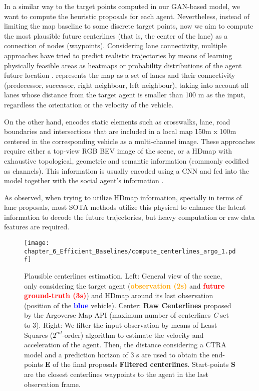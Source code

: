 In a similar way to the target points computed in our \ac{GAN}-based model, we want to compute the heuristic proposals for each agent. Nevertheless, instead of limiting the map baseline to some discrete target points, now we aim to compute the most plausible future centerlines (that is, the center of the lane) as a connection of nodes (waypoints). Considering lane connectivity, multiple approaches have tried to predict realistic trajectories by means of learning physically feasible areas as heatmaps or probability distributions of the agent future location \cite{dendorfer2020goal, sadeghian2019sophie, gilles2021home}. \cite{liang2020learning} represents the map as a set of lanes and their connectivity (predecessor, successor, right neighbour, left neighbour), taking into account all lanes whose distance from the target agent is smaller than 100 m as the input, regardless the orientation or the velocity of the vehicle. 

On the other hand, \cite{djuric2021multixnet} encodes static elements such as crosswalks, lane, road boundaries and intersections that are included in a local map 150m x 100m centered in the corresponding vehicle  as a multi-channel image.  These approaches require either a top-view RGB \ac{BEV} image of the scene, or a \ac{HDmap} with exhaustive topological, geometric and semantic information (commonly codified as channels). This information is usually encoded using a \ac{CNN} and fed into the model together with the social agent's information \cite{dendorfer2020goal, sadeghian2019sophie, gao2020vectornet}. 

As observed, when trying to utilize \ac{HDmap} information, specially in terms of lane proposals, most \ac{SOTA} methods utilize this physical to enhance the latent information to decode the future trajectories, but heavy computation or raw data features are required. 

\begin{figure*}[]
	\centering
	\texttt{[image: chapter\_6\_Efficient\_Baselines/compute\_centerlines\_argo\_1.pdf]}
	\captionsetup{justification=justified}
	\caption[Plausible centerlines estimation in Argoverse 1]{Plausible centerlines estimation. Left: General view of the scene, only considering the target agent (\textbf{\textcolor{orange}{observation (2s)}} and \textbf{\textcolor{red}{future ground-truth (3s)}}) and \ac{HDmap} around its last observation (position of the \textbf{\textcolor{blue}{blue}} vehicle). Center: \textbf{Raw Centerlines} proposed by the Argoverse Map \ac{API} (maximum number of centerlines \textit{C} set to 3). Right: We filter the input observation by means of Least-Squares ($2^{nd}$-order) algorithm to estimate the velocity and acceleration of the agent. Then, the distance considering a \ac{CTRA} model and a prediction horizon of 3 s are used to obtain the end-points \textbf{E} of the final proposals \textbf{Filtered centerlines}. Start-points \textbf{S} are the closest centerlines waypoints to the agent in the last observation frame.}
	\label{fig:chapter_6_Efficient_Baselines/efficient_baselines_hdmap_filtering}
\end{figure*}

